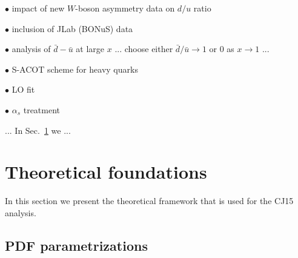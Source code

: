 \documentclass[aps,prd,amsmath,preprint]{revtex4}
\begin{document}
$\bullet$
impact of new $W$-boson asymmetry data on $d/u$ ratio

$\bullet$
inclusion of JLab (BONuS) data

$\bullet$
analysis of $\bar d - \bar u$ at large $x$ ... choose either
$\bar d/\bar u \to 1$ or 0 as $x \to 1$ ...

$\bullet$
S-ACOT scheme for heavy quarks

$\bullet$
LO fit

$\bullet$
$\alpha_s$ treatment



... In Sec.~\ref{sec:thy} we ...




\section{Theoretical foundations}
\label{sec:thy}

In this section we present the theoretical framework that is used for
the CJ15 analysis.


\subsection{PDF parametrizations}
\label{ssec:parametrizations}
\end{document}
